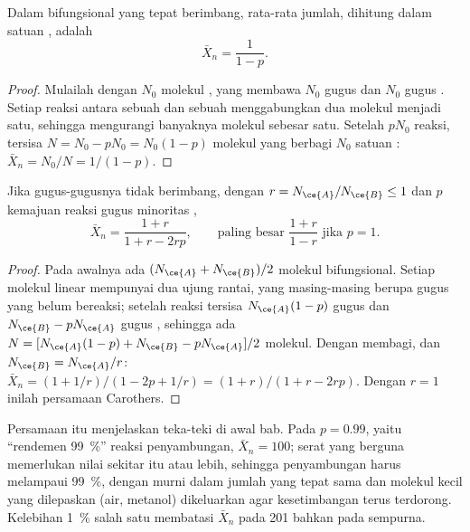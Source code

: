 \begin{theorem}\label{thm:b2:polymer-synthesis:carothers}
Dalam   bifungsional yang
tepat berimbang,  rata-rata jumlah, dihitung dalam
satuan , adalah
\begin{equation*}
\bar X_n = \frac{1}{1 - p}.
\end{equation*}
\end{theorem}

\begin{proof}
Mulailah dengan $N_0$ molekul , yang membawa $N_0$ gugus  dan
$N_0$ gugus . Setiap reaksi antara sebuah  dan sebuah 
menggabungkan dua molekul menjadi satu, sehingga mengurangi banyaknya
molekul sebesar satu. Setelah $pN_0$ reaksi, tersisa $N = N_0 - pN_0 = N_0(1-p)$
molekul yang berbagi $N_0$ satuan : $\bar X_n = N_0/N = 1/(1-p)$.
\end{proof}

\begin{corollary}[Ketakseimbangan]\label{cor:b2:polymer-synthesis:imbalance}
Jika gugus-gugusnya tidak berimbang, dengan $r = N_{\ce{A}}/N_{\ce{B}} \le 1$
dan $p$ kemajuan reaksi gugus minoritas ,
\begin{equation*}
\bar X_n = \frac{1 + r}{1 + r - 2rp}, \qquad \text{paling besar } \frac{1+r}{1-r} \text{ jika } p = 1.
\end{equation*}
\end{corollary}

\begin{proof}
Pada awalnya ada $(N_{\ce{A}} + N_{\ce{B}})/2$ molekul  bifungsional.
Setiap molekul linear mempunyai dua ujung rantai, yang masing-masing berupa
gugus yang belum bereaksi; setelah reaksi tersisa $N_{\ce{A}}(1-p)$
gugus  dan $N_{\ce{B}} - pN_{\ce{A}}$ gugus , sehingga ada $N = [N_{\ce{A}}(1-p) + N_{\ce{B}} -
pN_{\ce{A}}]/2$ molekul. Dengan membagi, dan $N_{\ce{B}} = N_{\ce{A}}/r$:
$\bar X_n = (1 + 1/r)/(1 - 2p + 1/r) = (1+r)/(1 + r - 2rp)$. Dengan $r = 1$
inilah persamaan Carothers.
\end{proof}

Persamaan itu menjelaskan teka-teki di awal bab. Pada $p = 0.99$, yaitu
``rendemen 99~\%'' reaksi penyambungan, $\bar X_n =
100$; serat yang berguna memerlukan nilai sekitar itu atau lebih, sehingga
penyambungan harus melampaui 99~\%, dengan  murni dalam jumlah yang
tepat sama dan molekul kecil yang dilepaskan (air, metanol) dikeluarkan agar
kesetimbangan terus terdorong. Kelebihan 1~\% salah satu  membatasi
$\bar X_n$ pada 201 bahkan pada  sempurna.

